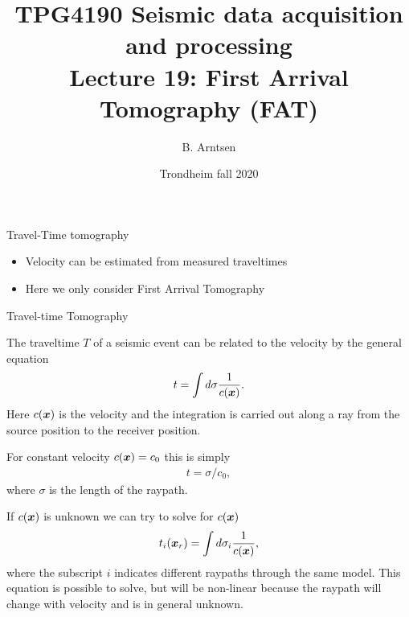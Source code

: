 \documentclass[xcolor=dvipsnames,notes]{beamer}
\begin{document}
\title{TPG4190 Seismic data acquisition and processing \\
               Lecture 19: First Arrival Tomography (FAT)}
\author{B. Arntsen}
\date{Trondheim fall 2020}
\begin{frame}
 \titlepage
\end{frame}
%
\begin{frame}{Travel-Time tomography}
\begin{itemize}
   \item Velocity can be estimated from measured traveltimes
   \item Here we only consider First Arrival Tomography
\end{itemize}
\end{frame}
\begin{frame}{Travel-time Tomography}

The traveltime $T$ of a seismic event can be related to
the velocity by the general equation
\begin{eqnarray}
t = \int d\sigma \frac{1}{c(\mbox{\boldmath $x$})}.
\end{eqnarray}
Here $c(\mbox{\boldmath $x$})$ is the velocity and the integration is
carried out along a ray from the source position to
the receiver position.

For constant velocity $c(\mbox{\boldmath $x$})=c_0$ this is simply
\begin{eqnarray}
t = \sigma/c_0,
\end{eqnarray}
where $\sigma$ is the length of the raypath.

If $c(\mbox{\boldmath $x$})$ is unknown we can try to solve for $c(\mbox{\boldmath $x$})$
\begin{eqnarray}
t_i(\mbox{\boldmath $x$}_r) = \int d\sigma_i \frac{1}{c(\mbox{\boldmath $x$})},
\end{eqnarray}
where the subscript $i$ indicates different raypaths through the same model.
This equation is possible to solve, but will be non-linear because the raypath
will change with velocity and is in general unknown.
\end{frame}
\end{document}
